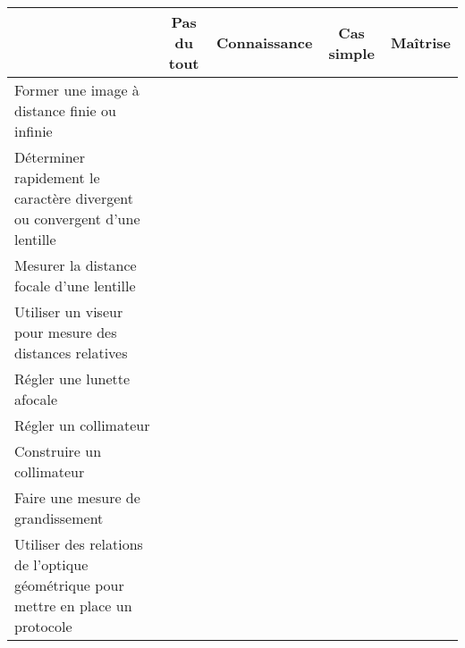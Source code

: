 \documentclass[11pt,french,landscape]{article}
\begin{document}

\begin{tabular}{|l|c|c|c|c|}
\toprule
 & Pas du tout & Connaissance & Cas simple & Maîtrise\\
\toprule
Former une image à distance finie ou infinie & & & & \\
\midrule
Déterminer rapidement le caractère divergent ou convergent d'une lentille & & & & \\
\midrule
Mesurer la distance focale d'une lentille & & & & \\
\midrule
Utiliser un viseur pour mesure des distances relatives & & & & \\
\midrule
Régler une lunette afocale & & & & \\
\midrule
Régler un collimateur & & & & \\
\midrule
Construire un collimateur & & & & \\
\midrule
Faire une mesure de grandissement & & & & \\
\midrule
Utiliser des relations de l'optique géométrique pour mettre en place un protocole & & & & \\
\bottomrule
\end{tabular}
\end{document}
